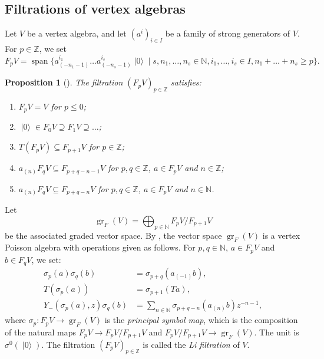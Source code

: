 \documentclass[a4paper, 12pt, reqno]{amsart}
\newtheorem{proposition}[theorem]{Proposition}
\theoremstyle{remark}
\numberwithin{equation}{subsection}
\DeclareMathOperator{\gr}{gr}
\DeclareMathOperator{\vspan}{span}
\DeclareMathOperator{\vac}{|0\rangle}
\begin{document}
\subsection{Filtrations of vertex algebras}
\label{sec:filtr-vert-algebr}

Let $V$ be a vertex algebra, and let $(a^i)_{i \in I}$ be a family of strong generators of $V$.
For $p \in \mathbb{Z}$, we set
\begin{equation*}
  F_pV = \vspan\{a^{i_1}_{(-n_1 - 1)}\dots a^{i_s}_{(-n_s - 1)}\vac \mid s, n_1, \dots, n_s \in \mathbb{N}, i_1, \dots, i_s \in I, n_1 + \dots + n_s \ge p\}.
\end{equation*}

\begin{proposition}[{\cite{li_abelianizing_2005}}]
  \label{prp:10}
  The filtration $(F_pV)_{p \in \mathbb{Z}}$ satisfies:
  \begin{enumerate}
  \item $F_pV = V$ for $p \le 0$;
  \item $\vac \in F_0V \supseteq F_1V \supseteq \dots$;
  \item $T(F_pV) \subseteq F_{p + 1}V$ for $p \in \mathbb{Z}$;
  \item $a_{(n)}F_qV \subseteq F_{p + q - n - 1}V$ for $p, q \in \mathbb{Z}$, $a \in F_pV$ and $n \in \mathbb{Z}$;
  \item $a_{(n)}F_qV \subseteq F_{p + q - n}V$ for $p, q \in \mathbb{Z}$, $a \in F_pV$ and $n \in \mathbb{N}$.
  \end{enumerate}
\end{proposition}

Let
\begin{equation*}
  \gr_F(V) = \bigoplus_{p \in \mathbb{N}}F_pV/F_{p + 1}V
\end{equation*}
be the associated graded vector space.
By \cite{li_abelianizing_2005}, the vector space $\gr_F(V)$ is a vertex Poisson algebra with operations given as follows.
For $p, q \in \mathbb{N}$, $a \in F_pV$ and $b \in F_qV$, we set:
\begin{align*}
  \sigma_p(a)\sigma_q(b) &= \sigma_{p + q}(a_{(-1)}b), \\
  T(\sigma_p(a)) &= \sigma_{p + 1}(Ta), \\
  Y_-(\sigma_p(a), z)\sigma_q(b) &= \sum_{n \in \mathbb{N}}\sigma_{p + q - n}(a_{(n)}b)z^{-n - 1},
\end{align*}
where $\sigma_p: F_pV \to \gr_F(V)$ is the \emph{principal symbol map}, which is the composition of the natural maps $F_pV \to F_pV/F_{p + 1}V$ and $F_pV/F_{p+1}V \to \gr_F(V)$.
The unit is $\sigma^0(\vac)$.
The filtration $(F_pV)_{p \in \mathbb{Z}}$ is called the \emph{Li filtration} of $V$.
\end{document}
